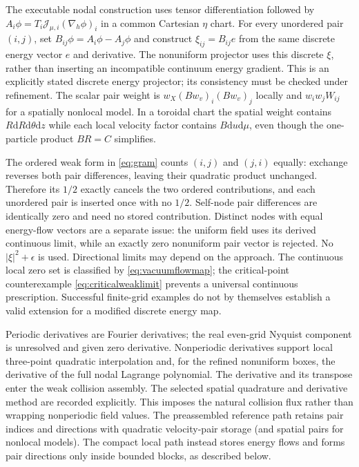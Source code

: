 \documentclass[11pt,letterpaper]{article}
\newcommand{\J}{\mathcal J}
\newcommand{\dd}{\mathrm d}
\begin{document}
The executable nodal construction uses tensor differentiation followed by
$A_i\phi=T_i\J_{\mu,i}(\nabla_h\phi)_i$ in a common Cartesian $\eta$ chart.
For every unordered pair $(i,j)$, set $B_{ij}\phi=A_i\phi-A_j\phi$ and construct
$\xi_{ij}=B_{ij}e$ from the same discrete energy vector $e$ and derivative.
The nonuniform projector uses this discrete $\xi$, rather than inserting an
incompatible continuum energy gradient. This is an explicitly stated discrete
energy projector; its consistency must be checked under refinement.
The scalar pair weight is $w_X(Bw_v)_i(Bw_v)_j$ locally and
$w_iw_jW_{ij}$ for a spatially nonlocal model. In a toroidal chart the spatial
weight contains $R\dd R\dd\theta\dd z$ while each local velocity factor contains
$B\dd u\dd\mu$, even though the one-particle product $BR=C$ simplifies.

The ordered weak form in \eqref{eq:gram} counts $(i,j)$ and $(j,i)$ equally:
exchange reverses both pair differences, leaving their quadratic product
unchanged. Therefore its $1/2$ exactly cancels the two ordered contributions,
and each unordered pair is inserted once with no $1/2$. Self-node pair
differences are identically zero and need no stored contribution. Distinct
nodes with equal energy-flow vectors are a separate issue: the uniform field
uses its derived continuous limit, while an exactly zero nonuniform pair vector
is rejected. No $|\xi|^2+\epsilon$ is used. Directional limits may depend on the
approach. The continuous local zero set is classified by
\eqref{eq:vacuumflowmap}; the critical-point counterexample
\eqref{eq:criticalweaklimit} prevents a universal continuous prescription.
Successful finite-grid examples do not by themselves establish a valid
extension for a modified discrete energy map.

Periodic derivatives are Fourier derivatives; the real even-grid Nyquist
component is unresolved and given zero derivative. Nonperiodic derivatives
support local three-point quadratic interpolation and, for the refined
nonuniform boxes, the derivative of the full nodal Lagrange polynomial.
The derivative and its transpose enter the weak collision assembly.
The selected spatial quadrature and derivative method are recorded explicitly.
This imposes the natural collision flux rather than
wrapping nonperiodic field values. The preassembled reference path retains
pair indices and directions with quadratic velocity-pair storage (and spatial
pairs for nonlocal models). The compact local path instead stores energy flows
and forms pair directions only inside bounded blocks, as described below.
\end{document}
